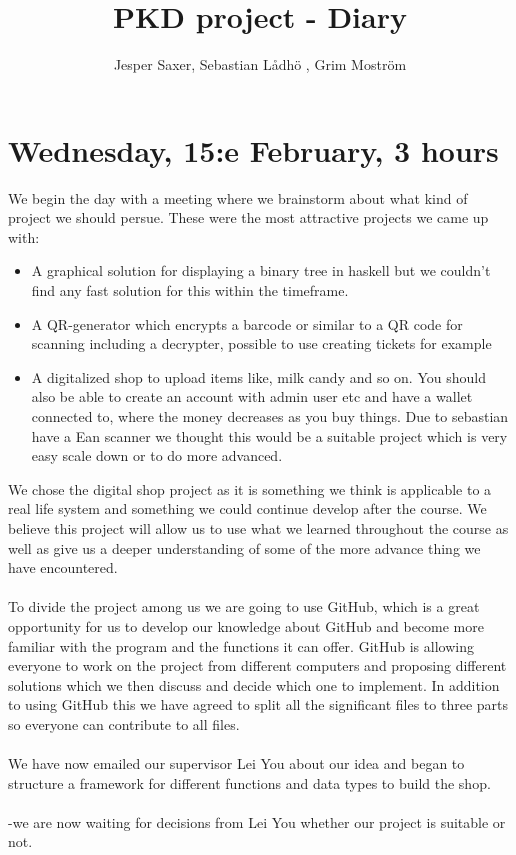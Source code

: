 \documentclass[11pt]{article}
\begin{document}
\title{PKD project - Diary}
\author{Jesper Saxer, Sebastian Lådhö , Grim Moström}
\date{}
\maketitle
\section*{Wednesday, 15:e February, 3 hours}
We begin the day with a meeting where we brainstorm about what kind of project we should persue. These were the most attractive projects we came up with:
\begin{itemize}
  \item A graphical solution for displaying a binary tree in haskell but we couldn't find any fast solution for this within the timeframe.
  \item A QR-generator which encrypts a barcode or similar to a QR code for scanning including a decrypter, possible to use creating tickets for example
  \item A digitalized shop to upload items like, milk candy and so on. You should also be able to create an account with admin user etc and have a wallet connected to, where the money decreases as you buy things. Due to sebastian have a Ean scanner we thought this would be a suitable project which is very easy scale down or to do more advanced.
\end{itemize}
We chose the digital shop project as it is something we think is applicable to a real life system and something we could continue develop after the course. We believe this project will allow us to use what we learned throughout the course as well as give us a deeper understanding of some of the more advance thing we have encountered.\\\\
To divide the project among us we are going to use GitHub, which is a great opportunity for us to develop our knowledge about GitHub and become more familiar with the program and the functions it can offer. GitHub is allowing everyone to work on the project from different computers and proposing different solutions which we then discuss and decide which one to implement. In addition to using GitHub this we have agreed to split all the significant files to three parts so everyone can contribute to all files.\\\\
We have now emailed our supervisor Lei You about our idea and began to structure a framework for different functions and data types to build the shop.\\\\
-we are now waiting for decisions from Lei You whether our project is suitable or not.\\
\end{document}
